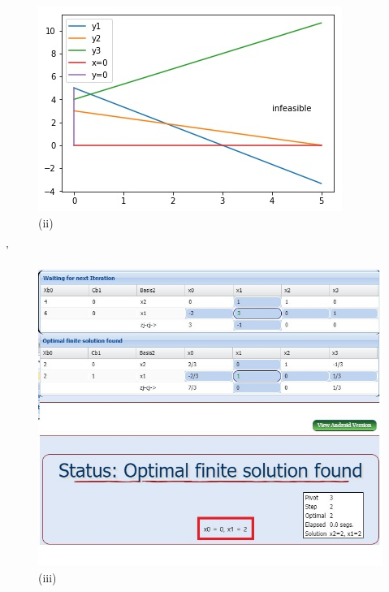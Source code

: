 \documentclass[letterpaper,12pt]{article}
\theoremstyle{definition}
\begin{document}
\begin{enumerate}
\begin{figure}[htbp]
\begin{center}
    \includegraphics[scale=0.51]{8p7b}
    \caption{(ii)} \label{fig:label}
\end{center}
\end{figure}
'
\begin{figure}[htbp]
\begin{center}
    \includegraphics[scale=0.46]{8p7c}
    \caption{(iii)} \label{fig:label}
\end{center}
\end{figure}
\phantom{aaaaa}
\phantom{aaaaa}
\phantom{aaaaa}
\phantom{aaaaa}
\phantom{aaaaa}
\phantom{aaaaa}
\phantom{aaaaa}
\phantom{aaaaa}
\phantom{aaaaa}
\phantom{aaaaa}
\phantom{aaaaa}\\
\\
\\


\end{enumerate}
\end{document}
